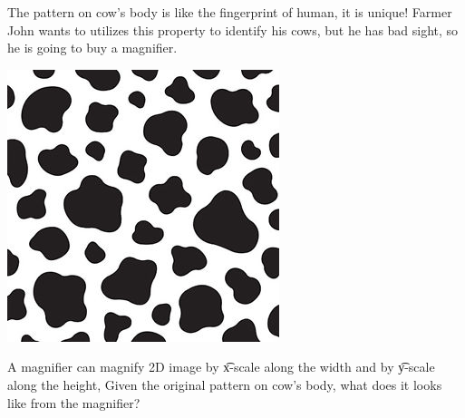 The pattern on cow's body is like the fingerprint of human, it is unique!
Farmer John wants to utilizes this property to identify his cows, but he has bad sight,
so he is going to buy a magnifier.

\begin{center}
  \includegraphics[scale=0.8, natwidth=250, natheight=200]{cow-pattern.jpg}
\end{center}

A magnifier can magnify 2D image by \t{x-scale} along the width and by \t{y-scale} along the height,
Given the original pattern on cow's body, what does it looks like from the magnifier?
